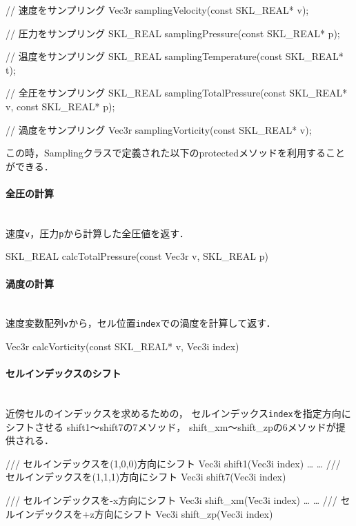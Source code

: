 {\small
\begin{program}
// 速度をサンプリング
Vec3r samplingVelocity(const SKL_REAL* v);

// 圧力をサンプリング
SKL_REAL samplingPressure(const SKL_REAL* p);

// 温度をサンプリング
SKL_REAL samplingTemperature(const SKL_REAL* t);

// 全圧をサンプリング
SKL_REAL samplingTotalPressure(const SKL_REAL* v, const SKL_REAL* p);

// 渦度をサンプリング
Vec3r samplingVorticity(const SKL_REAL* v);
\end{program}
}

この時，Samplingクラスで定義された以下のprotectedメソッドを利用することができる．
\pagebreak

%
\paragraph{全圧の計算}\mbox{}\\
速度{\tt v}，圧力{\tt p}から計算した全圧値を返す．
{\small
\begin{program}
SKL_REAL calcTotalPressure(const Vec3r v, SKL_REAL p)
\end{program}
}

%
\paragraph{渦度の計算}\mbox{}\\
速度変数配列{\tt v}から，セル位置{\tt index}での渦度を計算して返す．
{\small
\begin{program}
Vec3r calcVorticity(const SKL_REAL* v, Vec3i index)
\end{program}
}

%
\paragraph{セルインデックスのシフト}\mbox{}\\
近傍セルのインデックスを求めるための，
セルインデックス{\tt index}を指定方向にシフトさせる
shift1〜shift7の7メソッド，
shift\_xm〜shift\_zpの6メソッドが提供される．
{\small
\begin{program}
/// セルインデックスを(1,0,0)方向にシフト
Vec3i shift1(Vec3i index)
…
…
/// セルインデックスを(1,1,1)方向にシフト
Vec3i shift7(Vec3i index)

/// セルインデックスを-x方向にシフト
Vec3i shift_xm(Vec3i index) 
…
…
/// セルインデックスを+z方向にシフト
Vec3i shift_zp(Vec3i index)
\end{program}
}

